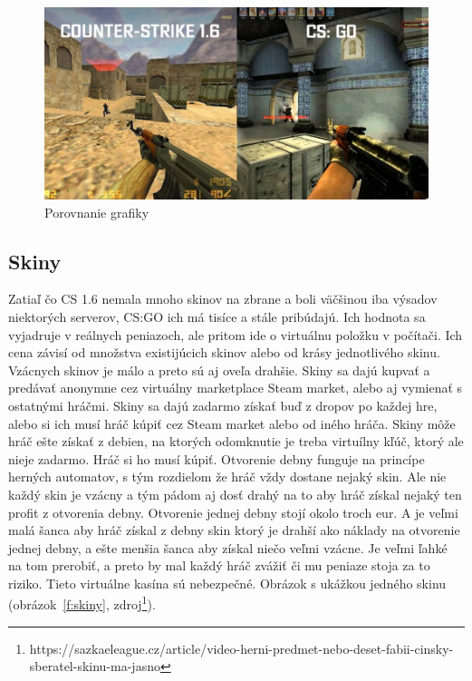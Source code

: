 \documentclass[10pt,oneside,slovak,a4paper]{article}
\begin{document}
\begin{figure}[tbh]
\centering
\includegraphics[scale=0.4]{1.6vsgo.jpg}
\caption{Porovnanie grafiky}
\label{f:grafika}
\end{figure}

\subsection{Skiny} \label{porovnanie:skiny}

Zatiaľ čo CS 1.6 nemala mnoho skinov na zbrane a boli väčšinou iba výsadov niektorých serverov, CS:GO ich má tisíce a stále pribúdajú. Ich hodnota sa vyjadruje v reálnych peniazoch, ale pritom ide o virtuálnu položku v počítači. Ich cena závisí od množstva existijúcich skinov alebo od krásy jednotlivého skinu. Vzácnych skinov je málo a preto sú aj oveľa drahšie. Skiny sa dajú kupvať a predávať anonymne cez virtuálny marketplace Steam market, alebo aj vymienať s ostatnými hráčmi.
Skiny sa dajú zadarmo získať buď z dropov po každej hre, alebo si ich musí hráč kúpiť cez Steam market alebo od iného hráča. Skiny môže hráč ešte získať z debien, na ktorých odomknutie je treba virtuílny kľúč, ktorý ale nieje zadarmo. Hráč si ho musí kúpiť. Otvorenie debny funguje na princípe herných automatov, s tým rozdielom že hráč vždy dostane nejaký skin. Ale nie každý skin je vzácny a tým pádom aj dosť drahý na to aby hráč získal nejaký ten profit z otvorenia debny. Otvorenie jednej debny stojí okolo troch eur. A je veľmi malá šanca aby hráč získal z debny skin ktorý je drahší ako náklady na otvorenie jednej debny, a ešte menšia šanca aby získal niečo veľmi vzácne. Je veľmi ľahké na tom prerobiť, a preto by mal každý hráč zvážiť či mu peniaze stoja za to riziko. Tieto virtuálne kasína sú nebezpečné.  Obrázok s ukážkou jedného skinu (obrázok~\ref{f:skiny}, zdroj\footnote{https://sazkaeleague.cz/article/video-herni-predmet-nebo-deset-fabii-cinsky-sberatel-skinu-ma-jasno}).
\end{document}
